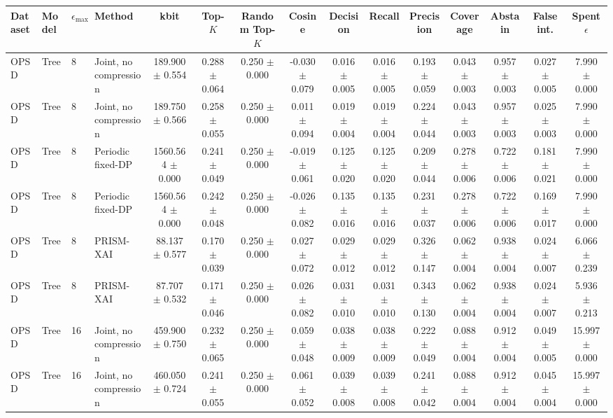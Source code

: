 \begin{tabular}{llllccccccccccc}
\toprule
Dataset & Model & $\epsilon_{\max}$ & Method & kbit & Top-$K$ & Random Top-$K$ & Cosine & Decision & Recall & Precision & Coverage & Abstain & False int. & Spent $\epsilon$ \\
\midrule
OPSD & Tree & 8 & Joint, no compression & 189.900 $\pm$ 0.554 & 0.288 $\pm$ 0.064 & 0.250 $\pm$ 0.000 & -0.030 $\pm$ 0.079 & 0.016 $\pm$ 0.005 & 0.016 $\pm$ 0.005 & 0.193 $\pm$ 0.059 & 0.043 $\pm$ 0.003 & 0.957 $\pm$ 0.003 & 0.027 $\pm$ 0.005 & 7.990 $\pm$ 0.000 \\
OPSD & Tree & 8 & Joint, no compression & 189.750 $\pm$ 0.566 & 0.258 $\pm$ 0.055 & 0.250 $\pm$ 0.000 & 0.011 $\pm$ 0.094 & 0.019 $\pm$ 0.004 & 0.019 $\pm$ 0.004 & 0.224 $\pm$ 0.044 & 0.043 $\pm$ 0.003 & 0.957 $\pm$ 0.003 & 0.025 $\pm$ 0.003 & 7.990 $\pm$ 0.000 \\
OPSD & Tree & 8 & Periodic fixed-DP & 1560.564 $\pm$ 0.000 & 0.241 $\pm$ 0.049 & 0.250 $\pm$ 0.000 & -0.019 $\pm$ 0.061 & 0.125 $\pm$ 0.020 & 0.125 $\pm$ 0.020 & 0.209 $\pm$ 0.044 & 0.278 $\pm$ 0.006 & 0.722 $\pm$ 0.006 & 0.181 $\pm$ 0.021 & 7.990 $\pm$ 0.000 \\
OPSD & Tree & 8 & Periodic fixed-DP & 1560.564 $\pm$ 0.000 & 0.242 $\pm$ 0.048 & 0.250 $\pm$ 0.000 & -0.026 $\pm$ 0.082 & 0.135 $\pm$ 0.016 & 0.135 $\pm$ 0.016 & 0.231 $\pm$ 0.037 & 0.278 $\pm$ 0.006 & 0.722 $\pm$ 0.006 & 0.169 $\pm$ 0.017 & 7.990 $\pm$ 0.000 \\
OPSD & Tree & 8 & PRISM-XAI & 88.137 $\pm$ 0.577 & 0.170 $\pm$ 0.039 & 0.250 $\pm$ 0.000 & 0.027 $\pm$ 0.072 & 0.029 $\pm$ 0.012 & 0.029 $\pm$ 0.012 & 0.326 $\pm$ 0.147 & 0.062 $\pm$ 0.004 & 0.938 $\pm$ 0.004 & 0.024 $\pm$ 0.007 & 6.066 $\pm$ 0.239 \\
OPSD & Tree & 8 & PRISM-XAI & 87.707 $\pm$ 0.532 & 0.171 $\pm$ 0.046 & 0.250 $\pm$ 0.000 & 0.026 $\pm$ 0.082 & 0.031 $\pm$ 0.010 & 0.031 $\pm$ 0.010 & 0.343 $\pm$ 0.130 & 0.062 $\pm$ 0.004 & 0.938 $\pm$ 0.004 & 0.024 $\pm$ 0.007 & 5.936 $\pm$ 0.213 \\
OPSD & Tree & 16 & Joint, no compression & 459.900 $\pm$ 0.750 & 0.232 $\pm$ 0.065 & 0.250 $\pm$ 0.000 & 0.059 $\pm$ 0.048 & 0.038 $\pm$ 0.009 & 0.038 $\pm$ 0.009 & 0.222 $\pm$ 0.049 & 0.088 $\pm$ 0.004 & 0.912 $\pm$ 0.004 & 0.049 $\pm$ 0.005 & 15.997 $\pm$ 0.000 \\
OPSD & Tree & 16 & Joint, no compression & 460.050 $\pm$ 0.724 & 0.241 $\pm$ 0.055 & 0.250 $\pm$ 0.000 & 0.061 $\pm$ 0.052 & 0.039 $\pm$ 0.008 & 0.039 $\pm$ 0.008 & 0.241 $\pm$ 0.042 & 0.088 $\pm$ 0.004 & 0.912 $\pm$ 0.004 & 0.045 $\pm$ 0.004 & 15.997 $\pm$ 0.000 \\

\end{tabular}
